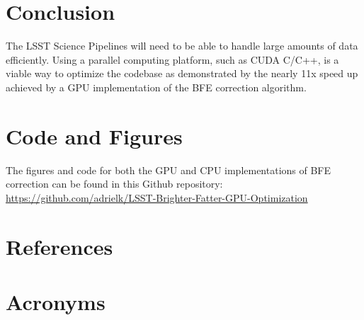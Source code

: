 \documentclass[DM,authoryear,toc]{lsstdoc}
\begin{document}
\section{Conclusion}

The LSST Science Pipelines will need to be able to handle large amounts of data efficiently. Using a parallel computing platform, such as CUDA C/C++, is a viable way to optimize the codebase as demonstrated by the nearly 11x speed up achieved by a GPU implementation of the BFE correction algorithm. 

\section{Code and Figures}

The figures and code for both the GPU and CPU implementations of BFE correction can be found in this Github repository:\newline
\url{https://github.com/adrielk/LSST-Brighter-Fatter-GPU-Optimization}

\appendix
\section{References} \label{sec:bib}
\renewcommand{\refname}{} %


\section{Acronyms} \label{sec:acronyms}

\end{document}
